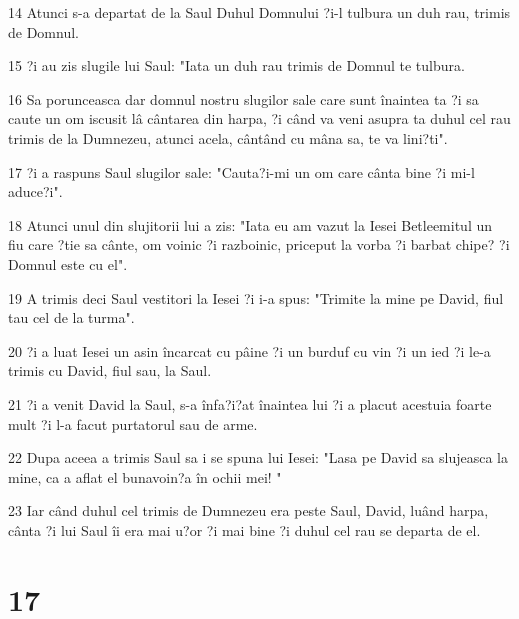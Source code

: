 \par 14 Atunci s-a departat de la Saul Duhul Domnului ?i-l tulbura un duh rau, trimis de Domnul.
\par 15 ?i au zis slugile lui Saul: "Iata un duh rau trimis de Domnul te tulbura.
\par 16 Sa porunceasca dar domnul nostru slugilor sale care sunt înaintea ta ?i sa caute un om iscusit lâ cântarea din harpa, ?i când va veni asupra ta duhul cel rau trimis de la Dumnezeu, atunci acela, cântând cu mâna sa, te va lini?ti".
\par 17 ?i a raspuns Saul slugilor sale: "Cauta?i-mi un om care cânta bine ?i mi-l aduce?i".
\par 18 Atunci unul din slujitorii lui a zis: "Iata eu am vazut la Iesei Betleemitul un fiu care ?tie sa cânte, om voinic ?i razboinic, priceput la vorba ?i barbat chipe? ?i Domnul este cu el".
\par 19 A trimis deci Saul vestitori la Iesei ?i i-a spus: "Trimite la mine pe David, fiul tau cel de la turma".
\par 20 ?i a luat Iesei un asin încarcat cu pâine ?i un burduf cu vin ?i un ied ?i le-a trimis cu David, fiul sau, la Saul.
\par 21 ?i a venit David la Saul, s-a înfa?i?at înaintea lui ?i a placut acestuia foarte mult ?i l-a facut purtatorul sau de arme.
\par 22 Dupa aceea a trimis Saul sa i se spuna lui Iesei: "Lasa pe David sa slujeasca la mine, ca a aflat el bunavoin?a în ochii mei! "
\par 23 Iar când duhul cel trimis de Dumnezeu era peste Saul, David, luând harpa, cânta ?i lui Saul îi era mai u?or ?i mai bine ?i duhul cel rau se departa de el.

\chapter{17}


